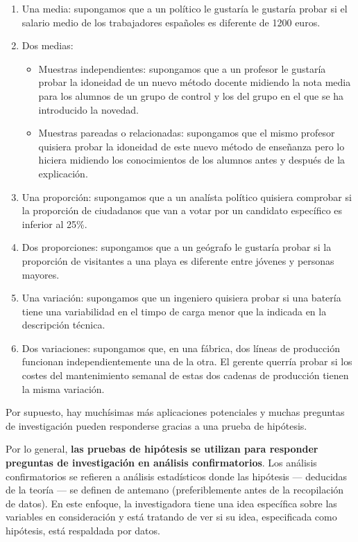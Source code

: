 \documentclass[
]{book}
\providecommand{\tightlist}{%
  \setlength{\itemsep}{0pt}\setlength{\parskip}{0pt}}
\begin{document}
\begin{enumerate}
\def\labelenumi{\arabic{enumi}.}
\tightlist
\item
  Una media: supongamos que a un político le gustaría le gustaría probar si el salario medio de los trabajadores españoles es diferente de 1200 euros.
\item
  Dos medias:

  \begin{itemize}
  \tightlist
  \item
    Muestras independientes: supongamos que a un profesor le gustaría probar la idoneidad de un nuevo método docente midiendo la nota media para los alumnos de un grupo de control y los del grupo en el que se ha introducido la novedad.
  \item
    Muestras pareadas o relacionadas: supongamos que el mismo profesor quisiera probar la idoneidad de este nuevo método de enseñanza pero lo hiciera midiendo los conocimientos de los alumnos antes y después de la explicación.
  \end{itemize}
\item
  Una proporción: supongamos que a un analísta político quisiera comprobar si la proporción de ciudadanos que van a votar por un candidato específico es inferior al 25\%.
\item
  Dos proporciones: supongamos que a un geógrafo le gustaría probar si la proporción de visitantes a una playa es diferente entre jóvenes y personas mayores.
\item
  Una variación: supongamos que un ingeniero quisiera probar si una batería tiene una variabilidad en el timpo de carga menor que la indicada en la descripción técnica.
\item
  Dos variaciones: supongamos que, en una fábrica, dos líneas de producción funcionan independientemente una de la otra. El gerente querría probar si los costes del mantenimiento semanal de estas dos cadenas de producción tienen la misma variación.
\end{enumerate}

Por supuesto, hay muchísimas más aplicaciones potenciales y muchas preguntas de investigación pueden responderse gracias a una prueba de hipótesis.

Por lo general, \textbf{las pruebas de hipótesis se utilizan para responder preguntas de investigación en análisis confirmatorios}. Los análisis confirmatorios se refieren a análisis estadísticos donde las hipótesis --- deducidas de la teoría --- se definen de antemano (preferiblemente antes de la recopilación de datos). En este enfoque, la investigadora tiene una idea específica sobre las variables en consideración y está tratando de ver si su idea, especificada como hipótesis, está respaldada por datos.
\end{document}
